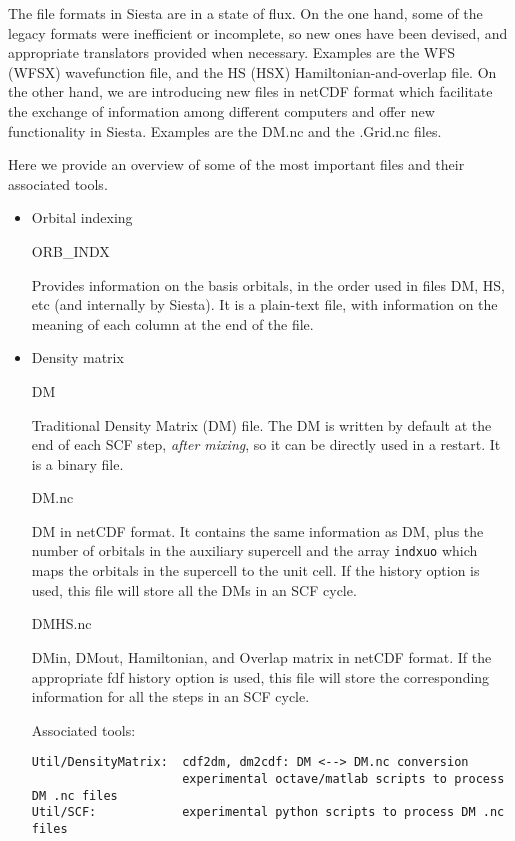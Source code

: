 \documentclass[11pt]{article}
\begin{document}
The file formats in Siesta are in a state of flux. On the one hand,
some of the legacy formats were inefficient or incomplete, so new ones
have been devised, and appropriate translators provided when
necessary.  Examples are the WFS (WFSX) wavefunction file, and the HS
(HSX) Hamiltonian-and-overlap file. On the other hand, we are
introducing new files in netCDF format which facilitate the exchange
of information among different computers and offer new functionality
in Siesta. Examples are the DM.nc and the .Grid.nc files.

Here we provide an overview of some of the most important files and their
associated tools.

\begin{itemize}
\item{Orbital indexing}

ORB\_INDX

Provides information on the basis orbitals, in the order used in files 
DM, HS, etc (and internally by Siesta). It is a plain-text file, with
information on the meaning of each column at the end of the file.

\item{Density matrix}

DM

Traditional Density Matrix (DM) file. The DM is written by default at
the end of each SCF step, {\em after mixing}, so it can be directly used
in a restart. It is a binary file.

DM.nc

DM in netCDF format. It contains the same information as DM, plus the
number of orbitals in the auxiliary supercell and the array {\tt indxuo}
which maps the orbitals in the supercell to the unit cell.  If the history
option is used, this file will store all the DMs in an SCF cycle.

DMHS.nc

DMin, DMout, Hamiltonian, and Overlap matrix in netCDF format. If the
appropriate fdf history option is used, this file will store the
corresponding information for all the steps in an SCF cycle.

Associated tools:

\begin{verbatim}
Util/DensityMatrix:  cdf2dm, dm2cdf: DM <--> DM.nc conversion
                     experimental octave/matlab scripts to process DM .nc files
Util/SCF:            experimental python scripts to process DM .nc files
\end{verbatim}


\end{itemize}
\end{document}
